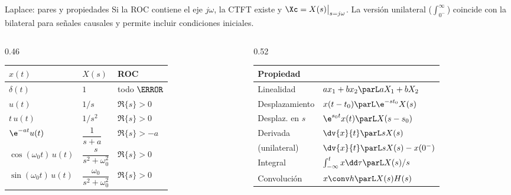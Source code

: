\documentclass[aspectratio=169,11pt]{beamer}
\begin{document}
\begin{frame}{Laplace: pares y propiedades}
  \small
  Si la ROC contiene el eje $j\omega$, la CTFT existe y $\Xc=X(s)\big|_{s=j\omega}$. La versión \alert{unilateral} ($\int_{0^-}^{\infty}$) coincide con la bilateral para señales causales y permite incluir condiciones iniciales.
  \medskip
  \begin{columns}[T]
    \begin{column}{0.46\textwidth}
      \small
      \renewcommand{\arraystretch}{1.3}
      \begin{tabular}{@{}lll@{}}
        \toprule
        $x(t)$ & $X(s)$ & ROC\\\midrule
        $\delta(t)$ & $1$ & todo $\C$\\
        $u(t)$ & $1/s$ & $\Re\{s\}>0$\\
        $t\,u(t)$ & $1/s^2$ & $\Re\{s\}>0$\\
        $\e^{-at}u(t)$ & $\dfrac{1}{s+a}$ & $\Re\{s\}>-a$\\
        $\cos(\omega_0t)\,u(t)$ & $\dfrac{s}{s^2+\omega_0^2}$ & $\Re\{s\}>0$\\
        $\sin(\omega_0t)\,u(t)$ & $\dfrac{\omega_0}{s^2+\omega_0^2}$ & $\Re\{s\}>0$\\\bottomrule
      \end{tabular}
    \end{column}
    \begin{column}{0.52\textwidth}
      \small
      \renewcommand{\arraystretch}{1.3}
      \begin{tabular}{@{}ll@{}}
        \toprule
        Propiedad & \\\midrule
        Linealidad & $a x_1+b x_2\parL aX_1+bX_2$\\
        Desplazamiento & $x(t-t_0)\parL\e^{-st_0}X(s)$\\
        Desplaz. en $s$ & $\e^{s_0t}x(t)\parL X(s-s_0)$\\
        Derivada & $\dv{x}{t}\parL sX(s)$\\
        \quad (unilateral) & $\dv{x}{t}\parL sX(s)-x(0^-)$\\
        Integral & $\int_{-\infty}^{t}x\dd\tau\parL X(s)/s$\\
        \alert{Convolución} & $x\conv h\parL X(s)H(s)$\\\bottomrule
      \end{tabular}
    \end{column}
  \end{columns}
\end{frame}
\end{document}
